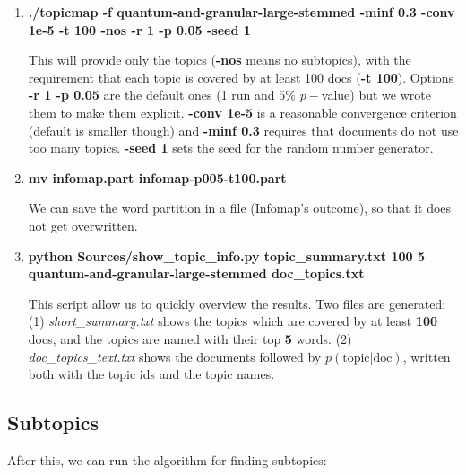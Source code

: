 \documentclass[11pt]{article}
\begin{document}
\begin{enumerate}

\item \textbf{./topicmap -f quantum-and-granular-large-stemmed -minf 0.3 -conv 1e-5 -t 100 -nos -r 1 -p 0.05 -seed 1}

\small{
This will provide only the topics (\textbf{-nos} means no subtopics), with the requirement that  each topic is covered by at least 100 docs (\textbf{-t 100}). Options \textbf{-r 1 -p 0.05} are the default ones (1 run and $5\%\,\, p-$value) but we wrote them to make them explicit. \textbf{-conv 1e-5} is a reasonable convergence criterion (default is smaller though) and \textbf{-minf 0.3} requires that documents do not use too many topics. \textbf{-seed 1} sets the seed for the random number generator.
}\normalsize{}

\item 
\textbf{mv infomap.part infomap-p005-t100.part}

\small{
We can save the word partition in  a file (Infomap's outcome), so that it does not get overwritten. 
}\normalsize{}



\item 
\textbf{python Sources/show\_topic\_info.py topic\_summary.txt 100 5 quantum-and-granular-large-stemmed doc\_topics.txt}

\small{
This script allow us to quickly overview the results. Two files are generated: (1) \textit{short\_summary.txt} shows the topics which are covered by at least \textbf{100} docs, and the topics are named with their top \textbf{5} words. (2)  \textit{doc\_topics\_text.txt} shows the documents followed by $p(\textrm{topic}|\textrm{doc})$, written both with the topic ids and the topic names.
}\normalsize{}




\end{enumerate}

\subsection{Subtopics}

 After this, we can run the algorithm for finding subtopics:
\end{document}

